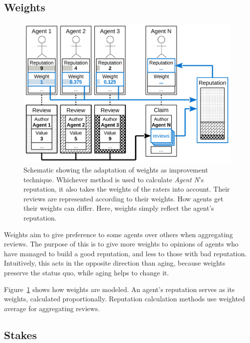 \documentclass[%
    ]{\PathToTumTemplate/thesis/tum_thesis}
\begin{document}
\subsection{Weights}

\begin{figure}[tbp]
  \begin{center}
        \includegraphics[width=0.85\linewidth]	{../images/improvement_weights-crop.pdf}
    \caption{
    Schematic showing the adaptation of weights as improvement technique.
    Whichever method is used to calculate \emph{Agent N}'s reputation, it also takes the weights of the raters into account.
    Their reviews are represented according to their weights.
    How agents get their weights can differ.
    Here, weights simply reflect the agent's reputation.
    }
    \label{fig:improvement_weights}
  \end{center}
\end{figure}

Weights aim to give preference to some agents over others when aggregating reviews.
The purpose of this is to give more weights to opinions of agents who have managed to build a good reputation, and less to those with bad reputation.
Intuitively, this acts in the opposite direction than aging, because weights preserve the status quo, while aging helps to change it.

Figure~\ref{fig:improvement_weights} shows how weights are modeled.
An agent's reputation serves as its weights, calculated proportionally.
Reputation calculation methods use weighted average for aggregating reviews.


\subsection{Stakes}
\end{document}
